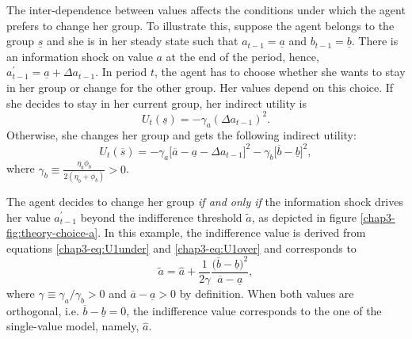 The inter-dependence between values affects the conditions under which the agent prefers to change her group. To illustrate this, suppose the agent belongs to the group $\underline{s}$ and she is in her steady state such that $a_{t-1}=\underline{a}$ and $b_{t-1} = \underline{b}$.
%
There is an information shock on value $a$ at the end of the period, hence, $a_{t-1}^\prime = \underline{a} + \Delta a_{t-1}$. In period $t$, the agent has to choose whether she wants to stay in her group or change for the other group. Her values depend on this choice. If she decides to stay in her current group, her indirect utility is
\begin{equation}\label{chap3-eq:U1under}
    U_t(\underline{s}) = - \gamma_a \left(\Delta a_{t-1}\right)^2.
\end{equation}
Otherwise, she changes her group and gets the following indirect utility:
\begin{equation}\label{chap3-eq:U1over}
    U_t(\overline{s}) = - \gamma_a \big[\overline{a} - \underline{a}-\Delta a_{t-1}\big]^2
    - \gamma_b \big[\overline{b}-\underline{b}\big]^2,
\end{equation}
where $\gamma_b \equiv \frac{\eta_b\phi_b}{2(\eta_b+\phi_b)}>0$. 

The agent decides to change her group \textit{if and only if} the information shock drives her value $a^\prime_{t-1}$ beyond the indifference threshold $\widetilde{a}$, as depicted in figure \ref{chap3-fig:theory-choice-a}. In this example, the indifference value is derived from equations \eqref{chap3-eq:U1under} and \eqref{chap3-eq:U1over} and corresponds to
\begin{equation}\label{chap3-eq:indiff}
    \widetilde{a} = \widehat{a} + \frac{1}{2\gamma}\frac{\big(\overline{b}-\underline{b}\big)^2}{\overline{a}-\underline{a}},
\end{equation}
where $\gamma \equiv \gamma_a/\gamma_b > 0$ and $\overline{a}-\underline{a} > 0$ by definition.
When both values are orthogonal, i.e. $\overline{b}-\underline{b} = 0$, the indifference value corresponds to the one of the single-value model, namely, $\widehat{a}$.

